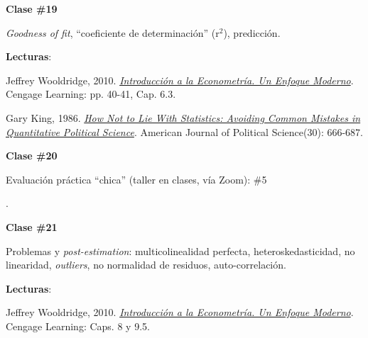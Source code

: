 \documentclass[letterpaper]{article}
\renewenvironment{itemize}{
  \begin{list}{}{
    \setlength{\leftmargin}{1.5em}
  }
}{
  \end{list}
}
\begin{document}
\begin{enumerate}
			\begin{itemize} 
				\item[$\bullet$] {\bf Clase \#19}
					\begin{itemize} 
						\item[$\circ$] \emph{Goodness of fit}, ``coeficiente de determinaci\'on'' (r$^2$), predicci\'on. 
						\item[$\circ$] {\bf Lecturas}:
							\begin{itemize} 
								\item[$\diamond$] Jeffrey Wooldridge, 2010. \href{https://github.com/hbahamonde/Metodos_Cuanti_I/raw/master/Readings/Wooldridge.pdf}{\emph{Introducci\'on a la Econometr\'ia. Un Enfoque Moderno}}. Cengage Learning: pp. 40-41, Cap. 6.3.
								\item[$\diamond$] Gary King, 1986. \href{https://github.com/hbahamonde/Metodos_Cuanti_I/raw/master/Readings/King.pdf}{\emph{How Not to Lie With Statistics: Avoiding Common Mistakes in Quantitative Political Science}}. American Journal of Political Science(30): 666-687.

							\end{itemize}
					\end{itemize}
			\end{itemize}



			\begin{itemize} 
				\item[$\bullet$] {\bf Clase \#20}
					\begin{itemize} 
						{\color{red}\item[\Pointinghand] Evaluaci\'on pr\'actica ``chica'' (taller en clases, v\'ia Zoom): \#5}. %
					\end{itemize}
			\end{itemize}




			\begin{itemize} 
				\item[$\bullet$] {\bf Clase \#21}
					\begin{itemize} 
						\item[$\circ$] Problemas y \emph{post-estimation}: multicolinealidad perfecta, heteroskedasticidad, no linearidad, \emph{outliers}, no normalidad de residuos, auto-correlaci\'on. %
						\item[$\circ$] {\bf Lecturas}: 
						\begin{itemize}
						\item[$\diamond$] Jeffrey Wooldridge, 2010. \href{https://github.com/hbahamonde/Metodos_Cuanti_I/raw/master/Readings/Wooldridge.pdf}{\emph{Introducci\'on a la Econometr\'ia. Un Enfoque Moderno}}. Cengage Learning: Caps. 8 y 9.5.
						\end{itemize}
					\end{itemize}
			\end{itemize}




\end{enumerate}
\end{document}
